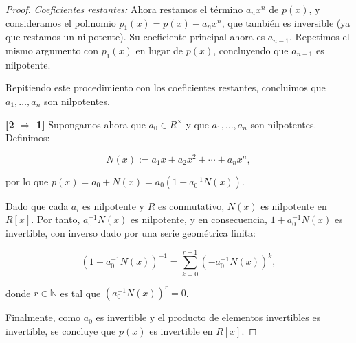 \begin{proof}
	
	\medskip
	
	\noindent \textit{Coeficientes restantes:} Ahora restamos el término \( a_n x^n \) de \( p(x) \), y consideramos el polinomio \( p_1(x) = p(x) - a_n x^n \), que también es inversible (ya que restamos un nilpotente). Su coeficiente principal ahora es \( a_{n-1} \). Repetimos el mismo argumento con \( p_1(x) \) en lugar de \( p(x) \), concluyendo que \( a_{n-1} \) es nilpotente.
	
	Repitiendo este procedimiento con los coeficientes restantes, concluimos que \( a_1, \dots, a_n \) son nilpotentes.
	
	\bigskip
	
	\noindent \textbf{[2 $\Rightarrow$ 1]} Supongamos ahora que \( a_0 \in R^\times \) y que \( a_1, \dots, a_n \) son nilpotentes. Definimos:
	
	
	\[
	N(x) := a_1 x + a_2 x^2 + \cdots + a_n x^n,
	\]
	
	
	por lo que \( p(x) = a_0 + N(x) = a_0 \left( 1 + a_0^{-1} N(x) \right) \).
	
	Dado que cada \( a_i \) es nilpotente y \( R \) es conmutativo, \( N(x) \) es nilpotente en \( R[x] \). Por tanto, \( a_0^{-1} N(x) \) es nilpotente, y en consecuencia, \( 1 + a_0^{-1} N(x) \) es invertible, con inverso dado por una serie geométrica finita:
	
	
	\[
	\left( 1 + a_0^{-1} N(x) \right)^{-1} = \sum_{k=0}^{r-1} (-a_0^{-1} N(x))^k,
	\]
	
	
	donde \( r \in \mathbb{N} \) es tal que \( (a_0^{-1} N(x))^r = 0 \).
	
	Finalmente, como \( a_0 \) es invertible y el producto de elementos invertibles es invertible, se concluye que \( p(x) \) es invertible en \( R[x] \).
\end{proof}


































































